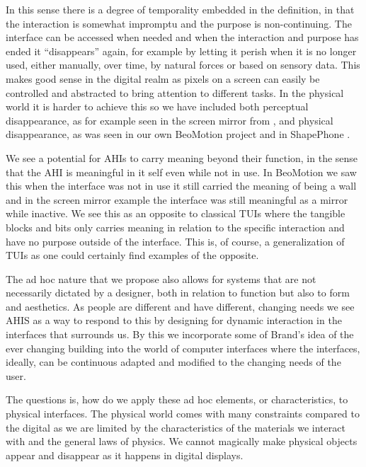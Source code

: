In this sense there is a degree of temporality embedded in the definition, in that the interaction is somewhat impromptu and the purpose is non-continuing.
The interface can be accessed when needed and when the interaction and purpose has ended it ``disappears'' again, for example by letting it perish when it is no longer used, either manually, over time, by natural forces or based on sensory data.
This makes good sense in the digital realm as pixels on a screen can easily be controlled and abstracted to bring attention to different tasks.
In the physical world it is harder to achieve this so we have included both perceptual disappearance, as for example seen in the screen mirror from \citep{lynggaard2012had}, and physical disappearance, as was seen in our own BeoMotion project \citep{beomotionreportstefan, beomotionreporttore} and in ShapePhone \citep{follmer2012jamming}.

We see a potential for AHIs to carry meaning beyond their function, in the sense that the AHI is meaningful in it self even while not in use.
In BeoMotion we saw this when the interface was not in use it still carried the meaning of being a wall and in the screen mirror example the interface was still meaningful as a mirror while inactive.
We see this as an opposite to classical TUIs where the tangible blocks and bits only carries meaning in relation to the specific interaction and have no purpose outside of the interface. 
This is, of course, a generalization of TUIs as one could certainly find examples of the opposite. 

The ad hoc nature that we propose also allows for systems that are not necessarily dictated by a designer, both in relation to function but also to form and aesthetics.
As people are different and have different, changing needs we see AHIS as a way to respond to this by designing for dynamic interaction in the interfaces that surrounds us.
By this we incorporate some of Brand's idea of the ever changing building into the world of computer interfaces where the interfaces, ideally, can be continuous adapted and modified to the changing needs of the user.

The questions is, how do we apply these ad hoc elements, or characteristics, to physical interfaces.
The physical world comes with many constraints compared to the digital as we are limited by the characteristics of the materials we interact with and the general laws of physics.
We cannot magically make physical objects appear and disappear as it happens in digital displays.


